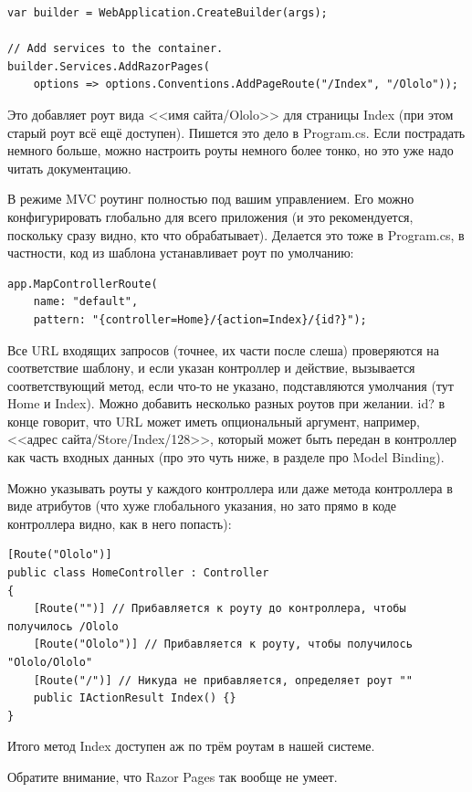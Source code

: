 \documentclass{../../text-style}
\begin{document}
\begin{verbatim}
var builder = WebApplication.CreateBuilder(args);

// Add services to the container.
builder.Services.AddRazorPages(
    options => options.Conventions.AddPageRoute("/Index", "/Ololo"));
\end{verbatim}

Это добавляет роут вида <<имя сайта/Ololo>> для страницы Index (при этом старый роут всё ещё доступен). Пишется это дело в Program.cs. Если пострадать немного больше, можно настроить роуты немного более тонко, но это уже надо читать документацию.

В режиме MVC роутинг полностью под вашим управлением. Его можно конфигурировать глобально для всего приложения (и это рекомендуется, поскольку сразу видно, кто что обрабатывает). Делается это тоже в Program.cs, в частности, код из шаблона устанавливает роут по умолчанию:

\begin{verbatim}
app.MapControllerRoute(
    name: "default",
    pattern: "{controller=Home}/{action=Index}/{id?}");
\end{verbatim}

Все URL входящих запросов (точнее, их части после слеша) проверяются на соответствие шаблону, и если указан контроллер и действие, вызывается соответствующий метод, если что-то не указано, подставляются умолчания (тут Home и Index). Можно добавить несколько разных роутов при желании. id? в конце говорит, что URL может иметь опциональный аргумент, например, <<адрес сайта/Store/Index/128>>, который может быть передан в контроллер как часть входных данных (про это чуть ниже, в разделе про Model Binding).

Можно указывать роуты у каждого контроллера или даже метода контроллера в виде атрибутов (что хуже глобального указания, но зато прямо в коде контроллера видно, как в него попасть):

\begin{verbatim}
[Route("Ololo")]
public class HomeController : Controller
{
    [Route("")] // Прибавляется к роуту до контроллера, чтобы получилось /Ololo
    [Route("Ololo")] // Прибавляется к роуту, чтобы получилось "Ololo/Ololo"
    [Route("/")] // Никуда не прибавляется, определяет роут ""
    public IActionResult Index() {}
}
\end{verbatim}

Итого метод Index доступен аж по трём роутам в нашей системе.

Обратите внимание, что Razor Pages так вообще не умеет.
\end{document}
